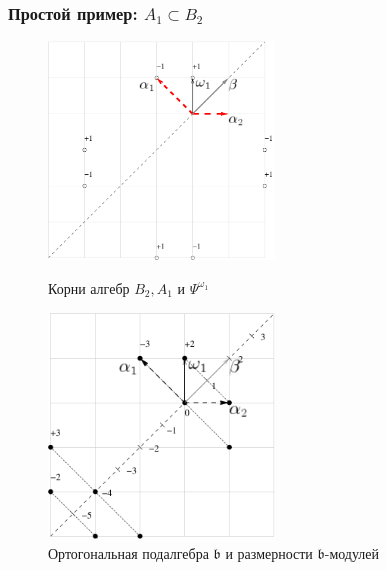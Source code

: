 \documentclass[pdftex]{beamer}
\theoremstyle{definition} \newtheorem{Def}{Определение}
\begin{document}
\begin{frame}
  \frametitle{Простой пример: $A_{1}\subset B_{2}$}
  \begin{figure}[t]
    \vspace*{-0.5cm}
    \begin{multicols}{2}
      \hfill
      \includegraphics[width=60mm]{figures/figure1}
      \hfill
      \caption{Корни алгебр $B_{2},A_{1}$ и $\Psi ^{\omega_1  }$}
      \hfill
      \vspace{5mm}
      \includegraphics[width=60mm]{figures/figure2}
      \caption{Ортогональная подалгебра $\mathfrak{b}$ и размерности $\mathfrak{b}$-модулей}
    \end{multicols}
  \end{figure}
\end{frame}
\end{document}
